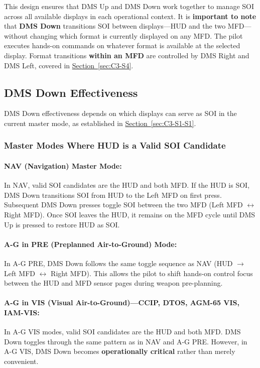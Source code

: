 \documentclass[11pt, a4paper, twoside]{report}
\newcommand{\secref}[1]{\hyperref[#1]{Section~\ref*{#1}}}
\begin{document}
This design ensures that DMS Up and DMS Down work together to manage SOI across all available displays in each operational context. It is \textbf{important to note} that \textbf{DMS Down} transitions SOI between displays—HUD and the two MFD—without changing which format is currently displayed on any MFD. The pilot executes hands-on commands on whatever format is available at the selected display. Format transitions \textbf{within an MFD} are controlled by DMS Right and DMS Left, covered in \secref{sec:C3-S4}.

\subsection{DMS Down Effectiveness}
\label{sec:C3-S3-S1}
DMS Down effectiveness depends on which displays can serve as SOI in the current master 
mode, as established in \secref{sec:C3-S1-S1}.

\subsubsection{Master Modes Where HUD is a Valid SOI Candidate}
\label{sec:C3-S3-S1-S1}

\paragraph{NAV (Navigation) Master Mode:}
In NAV, valid SOI candidates are the HUD and both MFD. If the HUD is SOI, DMS Down transitions SOI from HUD to the Left MFD on first press. Subsequent DMS Down presses toggle SOI between the two MFD (Left MFD $\leftrightarrow$ Right MFD). Once SOI leaves the HUD, it remains on the MFD cycle until DMS Up is pressed to restore HUD as SOI.

\paragraph{A-G in PRE (Preplanned Air-to-Ground) Mode:}
In A-G PRE, DMS Down follows the same toggle sequence as NAV (HUD $\rightarrow$ Left MFD $\leftrightarrow$ Right MFD). This allows the pilot to shift hands-on control focus between the HUD and MFD sensor pages during weapon pre-planning.

\paragraph{A-G in VIS (Visual Air-to-Ground)---CCIP, DTOS, AGM-65 VIS, IAM-VIS:}
In A-G VIS modes, valid SOI candidates are the HUD and both MFD. DMS Down toggles through the same pattern as in NAV and A-G PRE. However, in A-G VIS, DMS Down becomes \textbf{operationally critical} rather than merely convenient.
\end{document}

